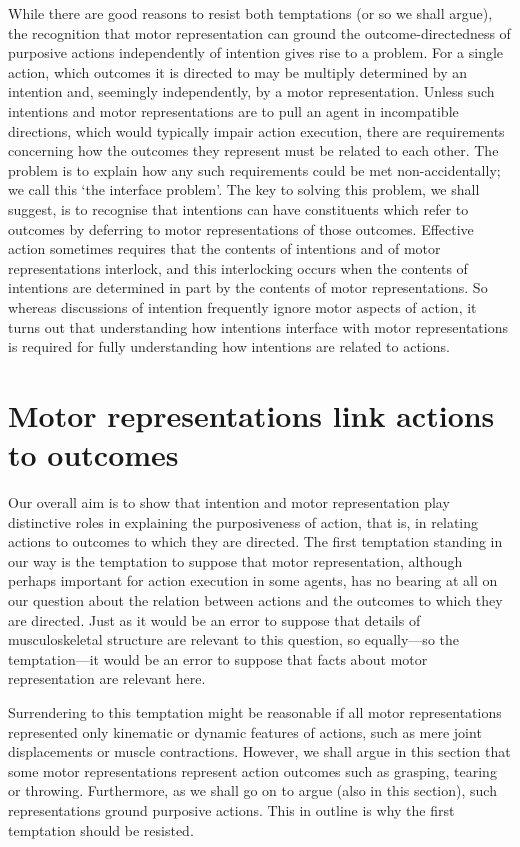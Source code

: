 \documentclass[12pt,\papersize]{extarticle}
\begin{document}
While there are good reasons to resist both temptations (or so we shall argue), the recognition that motor representation can ground the outcome-directedness of purposive actions independently of intention gives rise to a problem. For a single action, which outcomes it is directed to may be multiply determined by an intention and, seemingly independently, by a motor representation. Unless such intentions and motor representations are to pull an agent in incompatible directions, which would typically impair action execution, there are requirements concerning how the outcomes they represent must be related to each other. The problem is to explain how any such requirements could be met non-accidentally; we call this `the interface problem'. The key to solving this problem, we shall suggest, is to recognise that intentions can have constituents which refer to outcomes by deferring to motor representations of those outcomes. Effective action sometimes requires that the contents of intentions and of motor representations interlock, and this interlocking occurs when the contents of intentions are determined in part by the contents of motor representations.  So whereas discussions of intention frequently ignore motor aspects of action, it turns out that understanding how intentions interface with motor representations is required for fully understanding how intentions are related to actions.


\section{Motor representations link actions to outcomes}

Our overall aim is to show that intention and motor representation play distinctive roles in explaining the purposiveness of action, that is, in relating actions to outcomes to which they are directed. The first temptation standing in our way is the temptation to suppose that motor representation, although perhaps important for action execution in some agents, has no bearing at all on our question about the relation between actions and the outcomes to which they are directed. Just as it would be an error to suppose that details of musculoskeletal structure are relevant to this question, so equally---so the temptation---it would be an error to suppose that facts about motor representation are relevant here. 

Surrendering to this temptation might be reasonable if all motor representations represented only kinematic or dynamic features of actions, such as mere joint displacements or muscle contractions. However, we shall argue in this section that some motor representations represent action outcomes such as grasping, tearing or throwing. Furthermore, as we shall go on to argue (also in this section), such representations ground purposive actions. This in outline is why the first temptation should be resisted.
\end{document}
